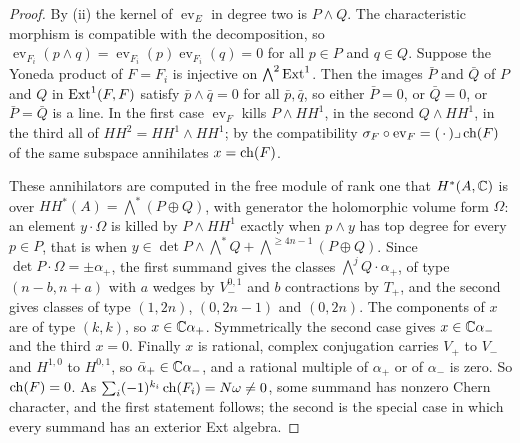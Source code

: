 \begin{proof}
By (ii) the kernel of $\operatorname{ev}_{E}$ in degree
two is $P\wedge Q$. The characteristic morphism is compatible with the
decomposition, so $\operatorname{ev}_{F_{i}}(p\wedge q)=
\operatorname{ev}_{F_{i}}(p)\operatorname{ev}_{F_{i}}(q)=0$ for all
$p\in P$ and $q\in Q$. Suppose the Yoneda product of $F=F_{i}$ is injective on
$\bigwedge^{2}\operatorname{Ext}^{1}$. Then the images $\bar P$ and $\bar Q$ of $P$ and $Q$
in $\operatorname{Ext}^{1}(F,F)$ satisfy $\bar p\wedge\bar q=0$ for all $\bar p,\bar q$, so
either $\bar P=0$, or $\bar Q=0$, or $\bar P=\bar Q$ is a line. In the first
case $\operatorname{ev}_{F}$ kills $P\wedge HH^{1}$, in the second
$Q\wedge HH^{1}$, in the third all of $HH^{2}=HH^{1}\wedge HH^{1}$; by the
compatibility $\sigma_{F}\circ\operatorname{ev}_{F}=(\,\cdot\,)\lrcorner
\operatorname{ch}(F)$ of  the same subspace annihilates $x=\operatorname{ch}(F)$.

These annihilators are computed in the free module of rank one that
$H^{*}(A,\mathbb{C})$ is over $HH^{*}(A)=\bigwedge^{*}(P\oplus Q)$, with generator the
holomorphic volume form $\Omega$: an element $y\cdot\Omega$ is killed by
$P\wedge HH^{1}$ exactly when $p\wedge y$ has top degree for every $p\in P$,
that is when $y\in\det P\wedge\bigwedge^{*}Q+\bigwedge^{\ge4n-1}(P\oplus Q)$.
Since $\det P\cdot\Omega=\pm\alpha_{+}$, the first summand gives the classes
$\bigwedge^{j}Q\cdot\alpha_{+}$, of type $(n-b,n+a)$ with $a$ wedges by
$V_{-}^{0,1}$ and $b$ contractions by $T_{+}$, and the second gives classes of
type $(1,2n)$, $(0,2n-1)$ and $(0,2n)$. The components of $x$ are of type
$(k,k)$, so $x\in\mathbb{C}\alpha_{+}$. Symmetrically the second case gives
$x\in\mathbb{C}\alpha_{-}$ and the third $x=0$. Finally $x$ is
rational, complex conjugation carries $V_{+}$ to $V_{-}$ and $H^{1,0}$ to
$H^{0,1}$, so $\bar\alpha_{+}\in\mathbb{C}\alpha_{-}$, and a rational multiple of
$\alpha_{+}$ or of $\alpha_{-}$ is zero. So $\operatorname{ch}(F)=0$. As
$\sum_{i}(-1)^{k_{i}}\operatorname{ch}(F_{i})=N\omega\ne0$, some summand has nonzero
Chern character, and the first statement follows; the second is the special
case in which every summand has an exterior Ext algebra.
\end{proof}
